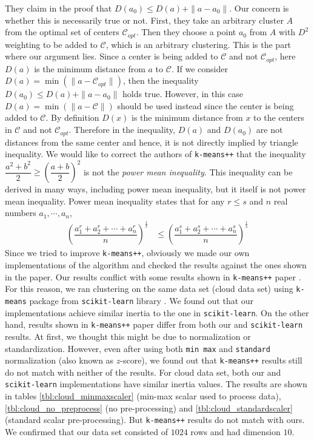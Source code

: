 \documentclass[twoside, 11pt]{article}
\newcommand{\C}{\mathcal{C}}
\begin{document}
	They claim in the proof that $D(a_0)\leq D(a)+\|a-a_0\|$. Our concern is whether this is necessarily true or not. First, they take an arbitrary cluster $A$ from the optimal set of centers $\C_{opt}$. Then they choose a point $a_0$ from $A$ with $D^2$ weighting to be added to $\C$, which is an arbitrary clustering. This is the part where our argument lies. Since a center is being added to $\C$ and not $\C_{opt}$, here $D(a)$ is the minimum distance from $a$ to $\C$. If we consider $D(a)=\min(\|a-\C_{opt}\|)$, then the inequality $D(a_0)\leq D(a)+\|a-a_0\|$ holds true. However, in this case $D(a)=\min(\|a-\C\|)$ should be used instead since the center is being added to $\C$. By definition $D(x)$ is the minimum distance from $x$ to the centers in $\C$ and not $\C_{opt}$. Therefore in the inequality, $D(a)$ and $D(a_0)$ are not distances from the same center and hence, it is not directly implied by triangle inequality. We would like to correct the authors of \texttt{k-means++} that the inequality $\dfrac{a^2+b^2}{2} \geq \left(\dfrac{a+b}{2}\right)^2$ is not the \textit{power mean inequality}. This inequality can be derived in many ways, including power mean inequality, but it itself is not power mean inequality. Power mean inequality states that for any $r\leq s$ and $n$ real numbers $a_1,\cdots,a_n$,
		\begin{align*}
			\left(\dfrac{a_1^r+a_2^r+\cdots+a_n^r}{n}\right)^{\frac{1}{r}} & \leq \left(\dfrac{a_1^s+a_2^s+\cdots+a_n^s}{n}\right)^{\frac{1}{s}}
		\end{align*}
	Since we tried to improve \texttt{k-means++}, obviously we made our own implementations of the algorithm and checked the results against the ones shown in the paper. Our results conflict with some results shown in \texttt{k-means++} paper \cite{kmeans++}. For this reason, we ran clustering on the same data set (cloud data set) using \texttt{k-means} package from \texttt{scikit-learn} library \citep{sklearn}. We found out that our implementations achieve similar inertia to the one in \texttt{scikit-learn}. On the other hand, results shown in \texttt{k-means++} paper differ from both our and \texttt{scikit-learn} results. At first, we thought this might be due to normalization or standardization. However, even after using both \texttt{min max} and \texttt{standard} normalization (also known as $z$-score), we found out that \texttt{k-means++} results still do not match with neither of the results. For cloud data set, both our and \texttt{scikit-learn} implementations have similar inertia values. The results are shown in tables \ref{tbl:cloud_minmaxscaler} (min-max scalar used to process data), \ref{tbl:cloud_no_preprocess} (no pre-processing) and \ref{tbl:cloud_standardscaler} (standard scalar pre-processing). But \texttt{k-means++} results \citep[Table $3$]{kmeans++} do not match with ours. We confirmed that our data set consisted of $1024$ rows and had dimension $10$. 
	
\end{document}
